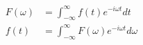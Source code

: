 \begin{equation}
\begin{split}
    F(\omega) &= \int_{-\infty}^{\infty} f(t) e^{-i\omega t} dt \\
    f(t) &= \int_{-\infty}^{\infty} F(\omega) e^{-i\omega t} d\omega
\end{split}
\label{eq:fourier-transform}
\end{equation}
